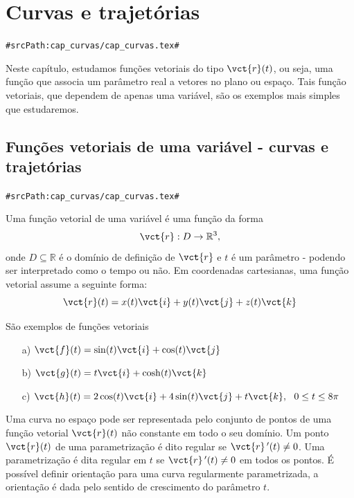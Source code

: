 

\chapter{Curvas e trajetórias}
\verb+#srcPath:cap_curvas/cap_curvas.tex#+

  Neste capítulo, estudamos funções vetoriais do tipo $\vct{r}(t)$, ou seja, uma função que associa um parâmetro real a vetores no plano ou espaço. Tais função vetoriais, que dependem de apenas uma variável, são os exemplos mais simples que estudaremos. %

\section{Funções vetoriais de uma variável - curvas e trajetórias}
\verb+#srcPath:cap_curvas/cap_curvas.tex#+

Uma função vetorial de uma variável é uma função da forma $$\vct{r}:D\to \mathbb{R}^3,$$ onde $D\subseteq \mathbb{R}$ é o domínio de definição de $\vct{r}$ e $t$ é um parâmetro - podendo ser interpretado como o tempo ou não. Em coordenadas cartesianas, uma função vetorial assume a seguinte forma:
$$\vct{r}(t)=x(t)\vct{i}+y(t)\vct{j}+z(t)\vct{k}$$
\begin{ex}\label{exfv1} São exemplos de funções vetoriais
\begin{itemize}
\item [a)] $\vct{f}(t)=\sin(t)\vct{i}+\cos(t)\vct{j}$
\item [b)] $\vct{g}(t)=t \vct{i}+\cosh(t)\vct{k}$
\item [c)] $\vct{h}(t)=2\cos(t)\vct{i}+4\sin(t)\vct{j}+t\vct{k},~~ 0\leq t \leq 8\pi$
\end{itemize}
\end{ex}  

Uma curva no espaço pode ser representada pelo conjunto de pontos de uma função vetorial $\vct{r}(t)$ não constante em todo o seu domínio. Um ponto $\vct{r}(t)$ de uma parametrização é dito regular se $\vct{r}\!~'(t)\neq 0$. Uma parametrização é dita regular em $t$ se $\vct{r}~\!'(t)\neq 0$ em todos os pontos. É possível definir orientação para uma curva regularmente parametrizada, a orientação é dada pelo sentido de crescimento do parâmetro $t$. 

